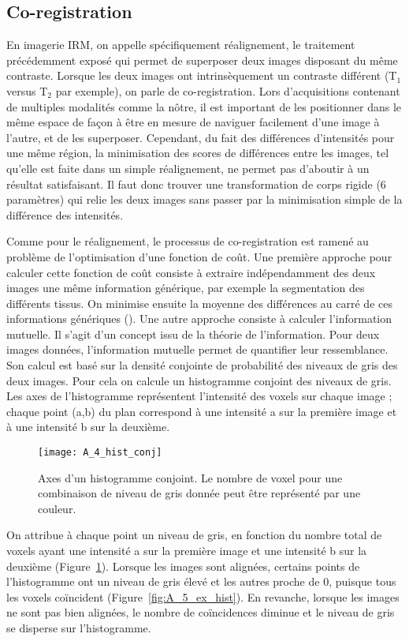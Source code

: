 \subsection{Co-registration}
En imagerie IRM, on appelle spécifiquement réalignement, le traitement précédemment
exposé qui permet de superposer deux images disposant du même contraste. Lorsque les deux images
ont intrinsèquement un contraste différent (T$_1$ versus T$_2$ par exemple), on parle de co-registration.
Lors d’acquisitions contenant de multiples modalités comme la nôtre, il est important de les
positionner dans le même espace de façon à être en mesure de naviguer facilement d’une image à
l’autre, et de les superposer. Cependant, du fait des différences d’intensités pour une même région, la
minimisation des scores de différences entre les images, tel qu’elle est faite dans un simple
réalignement, ne permet pas d’aboutir à un résultat satisfaisant. Il faut donc trouver une
transformation de corps rigide (6 paramètres) qui relie les deux images sans passer par la minimisation
simple de la différence des intensités.

Comme pour le réalignement, le processus de co-registration est ramené au problème de
l’optimisation d’une fonction de coût. Une première approche pour calculer cette fonction de coût
consiste à extraire indépendamment des deux images une même information générique, par exemple
la segmentation des différents tissus. On minimise ensuite la moyenne des différences au carré de ces
informations génériques (\cite{Ashburner1997}). Une autre approche consiste à calculer l’information mutuelle. Il s’agit
d’un concept issu de la théorie de l’information. Pour deux images données, l’information mutuelle
permet de quantifier leur ressemblance. Son calcul est basé sur la densité conjointe de probabilité des
niveaux de gris des deux images. Pour cela on calcule un histogramme conjoint des niveaux de gris. Les axes de l’histogramme représentent l’intensité des voxels sur chaque image ; chaque point (a,b) du
plan correspond à une intensité a sur la première image et à une intensité b sur la deuxième. 
\begin{figure}[!t]
\centering
\texttt{[image: A\_4\_hist\_conj]}
\caption{Axes d'un histogramme conjoint. Le nombre de voxel pour une combinaison de niveau de gris donnée peut être
représenté par une couleur.}
\label{fig:A_4_hist_conj}	
\end{figure}
On
attribue à chaque point un niveau de gris, en fonction du nombre total de voxels ayant une intensité a
sur la première image et une intensité b sur la deuxième (Figure~\ref{fig:A_4_hist_conj}). Lorsque les images sont alignées,
certains points de l’histogramme ont un niveau de gris élevé et les autres proche de 0, puisque tous
les voxels coïncident (Figure~\ref{fig:A_5_ex_hist}). En revanche, lorsque les images ne sont pas bien alignées, le nombre
de coïncidences diminue et le niveau de gris se disperse sur l’histogramme.

